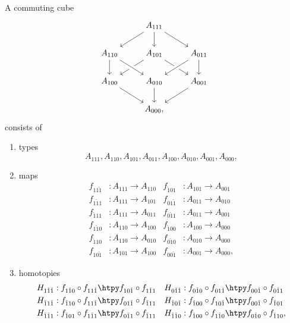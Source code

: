 \begin{defn}
A commuting cube
\begin{equation*}
\begin{tikzcd}
& A_{111} \arrow[dl] \arrow[dr] \arrow[d] \\
A_{110} \arrow[d] & A_{101} \arrow[dl] \arrow[dr] & A_{011} \arrow[dl,crossing over] \arrow[d] \\
A_{100} \arrow[dr] & A_{010} \arrow[d] \arrow[from=ul,crossing over] & A_{001} \arrow[dl] \\
& A_{000},
\end{tikzcd}
\end{equation*}
consists of 
\begin{enumerate}
\item types
\begin{equation*}
A_{111},A_{110},A_{101},A_{011},A_{100},A_{010},A_{001},A_{000},
\end{equation*}
\item maps
\begin{align*}
f_{11\check{1}} & : A_{111}\to A_{110} & f_{\check{1}01} & : A_{101}\to A_{001} \\
f_{1\check{1}1} & : A_{111}\to A_{101} & f_{01\check{1}} & : A_{011}\to A_{010} \\
f_{\check{1}11} & : A_{111}\to A_{011} & f_{0\check{1}1} & : A_{011}\to A_{001} \\
f_{1\check{1}0} & : A_{110}\to A_{100} & f_{\check{1}00} & : A_{100}\to A_{000} \\
f_{\check{1}10} & : A_{110}\to A_{010} & f_{0\check{1}0} & : A_{010}\to A_{000} \\
f_{10\check{1}} & : A_{101}\to A_{100} & f_{00\check{1}} & : A_{001}\to A_{000},
\end{align*}
\item homotopies
\begin{align*}
H_{1\check{1}\check{1}} & : f_{1\check{1}0}\circ f_{11\check{1}} \htpy f_{10\check{1}}\circ f_{1\check{1}1} & H_{0\check{1}\check{1}} & : f_{0\check{1}0}\circ f_{01\check{1}} \htpy f_{00\check{1}}\circ f_{0\check{1}1} \\
H_{\check{1}1\check{1}} & : f_{\check{1}10}\circ f_{11\check{1}} \htpy f_{01\check{1}}\circ f_{\check{1}11} & H_{\check{1}0\check{1}} & : f_{\check{1}00}\circ f_{10\check{1}} \htpy f_{00\check{1}}\circ f_{\check{1}01} \\
H_{\check{1}\check{1}1} & : f_{\check{1}01}\circ f_{1\check{1}1} \htpy f_{0\check{1}1}\circ f_{\check{1}11} & H_{\check{1}\check{1}0} & : f_{\check{1}00}\circ f_{1\check{1}0} \htpy f_{0\check{1}0}\circ f_{\check{1}10},

\end{align*}
\end{enumerate}
\end{defn}
